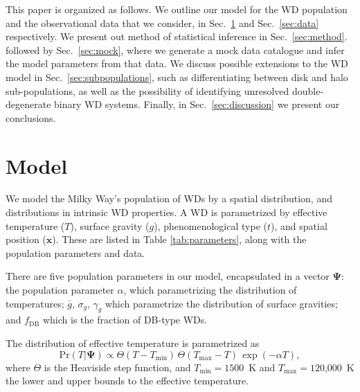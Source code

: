 \documentclass[fleqn,usenatbib]{mnras}
\newcommand{\popp}{\boldsymbol{\Psi}}
\newcommand{\Teff}{T}
\newcommand{\logg}{g}
\newcommand{\pr}{\text{Pr}}
\begin{document}
This paper is organized as follows. We outline our model for the WD population and the observational data that we consider, in Sec.~\ref{sec:model} and Sec.~\ref{sec:data} respectively. We present out method of statistical inference in Sec.~\ref{sec:method}.  followed by Sec.~\ref{sec:mock}, where we generate a mock data catalogue and infer the model parameters from that data. We discuss possible extensions to the WD model in Sec.~\ref{sec:subpopulations}, such as differentiating between disk and halo sub-populations, as well as the possibility of identifying unresolved double-degenerate binary WD systems. Finally, in Sec.~\ref{sec:discussion} we present our conclusions.





\section{Model}\label{sec:model}

We model the Milky Way's population of WDs by a spatial distribution, and distributions in intrinsic WD properties. A WD is parametrized by effective temperature ($\Teff$), surface gravity ($\logg$), phenomenological type ($t$), and spatial position ($\mathbf{x}$). These are listed in Table \ref{tab:parameters}, along with the population parameters and data.

There are five population parameters in our model, encapsulated in a vector $\popp$: the population parameter $\alpha$, which parametrizing the distribution of temperatures; $\bar{g}$, $\sigma_g$, $\gamma_g$ which parametrize the distribution of surface gravities; and $f_\text{DB}$ which is the fraction of DB-type WDs.

The distribution of effective temperature is parametrized as
\begin{equation}\label{eq:T}
    \pr(\Teff | \popp) \propto \Theta(\Teff - \Teff_\text{min})\, \Theta(\Teff_\text{max} - \Teff) \, \exp (-\alpha \Teff),
\end{equation}
where $\Theta$ is the Heaviside step function, and $\Teff_\text{min}=1500$~K and $\Teff_\text{max}=120$,000~K the lower and upper bounds to the effective temperature.
\end{document}
